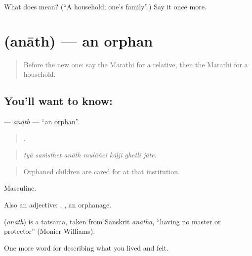 \begin{tcolorbox}[breakable,colback=teal!4,colframe=teal!35!black,title={Before you move on}]
What does  mean? (\textquotedblleft{}A household; one's family\textquotedblright{}.) Say it once more.
\end{tcolorbox}
\section[\texorpdfstring{\mr{अनाथ} (anāth)}{अनाथ (anāth)}]{ (anāth) — an orphan}

\label{lesson:MR-C494-anath}



\begin{quote}
Before the new one: say the Marathi for a relative, then the Marathi for a household.
\end{quote}

\subsection*{You'll want to know: }
\textbf{} — \emph{anāth} — \textquotedblleft{}an orphan\textquotedblright{}.

\begin{quote}
      .
\end{quote}

\begin{quote}
\emph{tyā saṁsthet anāth mulāñcī kāḷjī ghetlī jāte.}
\end{quote}

\begin{quote}
Orphaned children are cared for at that institution.
\end{quote}

Masculine.

Also an adjective:  . , an orphanage.

\begin{cousinweb}
\textbf{} (\emph{anāth}) is a tatsama, taken from Sanskrit \emph{anātha}, \textquotedblleft{}having no master or protector\textquotedblright{} (Monier-Williams).
\end{cousinweb}

\begin{grammarlens}[title={What you've built}]
One more word for describing what you lived and felt.
\end{grammarlens}

